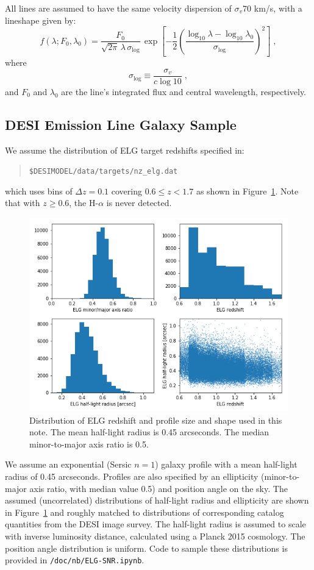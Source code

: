 \documentclass[12pt]{article}
\providecommand{\fig}[1]{Figure~\ref{fig:#1}}
\begin{document}
All lines are assumed to have the same velocity dispersion of $\sigma_v 70$ km/s, with a lineshape given by:
$$
f(\lambda; F_0, \lambda_0) = \frac{F_0}{\sqrt{2\pi}\,\lambda\,\sigma_{\log}}\, \exp\left[
-\frac{1}{2}\left( \frac{\log_{10}\lambda - \log_{10}\lambda_0}{\sigma_{\log}}\right)^2\right]\; ,
$$
where
$$
\sigma_{\log} \equiv \frac{\sigma_v}{c \log 10} \; ,
$$
and $F_0$ and $\lambda_0$ are the line's integrated flux and central wavelength, respectively.

\subsection{DESI Emission Line Galaxy Sample}

We assume the distribution of ELG target redshifts specified in:
\begin{quote}
{\tt \$DESIMODEL/data/targets/nz\_elg.dat}
\end{quote}  
which uses bins of $\Delta z = 0.1$ covering $0.6 \le z < 1.7$ as shown in \fig{elg-sample}.
Note that with $z \ge 0.6$, the H-$\alpha$ is never detected. 

\begin{figure}[htb]
\begin{center}
\includegraphics[width=6in]{elg-sample}
\caption{Distribution of ELG redshift and profile size and shape used in this note. The mean half-light radius is 0.45 arcseconds.
The median minor-to-major axis ratio is 0.5.}
\label{fig:elg-sample}
\end{center}
\end{figure}

We assume an exponential (Sersic $n=1$) galaxy profile with a mean half-light radius of 0.45 arcseconds. Profiles are also specified
by an ellipticity (minor-to-major axis ratio, with median value 0.5) and position angle on the sky. The assumed (uncorrelated)
distributions of half-light radius and ellipticity
are shown in \fig{elg-sample} and roughly matched to distributions of corresponding catalog quantities from the DESI image survey.
The half-light radius is assumed to scale with inverse luminosity distance, calculated using a Planck 2015 cosmology. The position angle
distribution is uniform. Code to sample these distributions is provided in {\tt /doc/nb/ELG-SNR.ipynb}.
\end{document}
